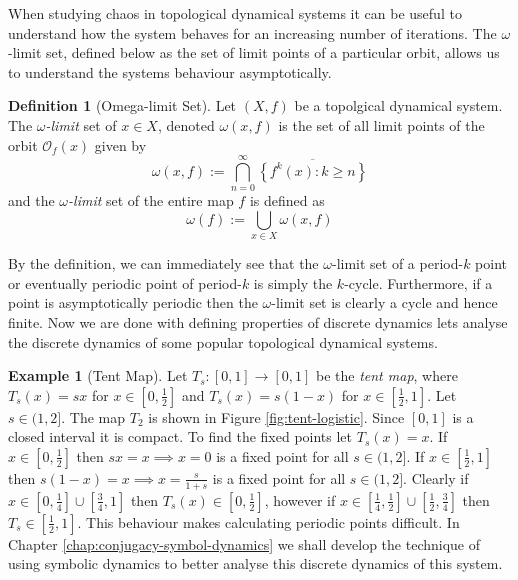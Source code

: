 \documentclass[11pt,a4paper,oneside]{memoir}
\theoremstyle{plain}
\theoremstyle{definition}
\newtheorem{defn}[thm]{Definition}
\newtheorem{exmp}[thm]{Example}
\begin{document}
When studying chaos in topological dynamical systems it can be useful to understand how the system behaves for an increasing number of iterations. The $\omega$-limit set, defined below as the set of limit points of a particular orbit, allows us to understand the systems behaviour asymptotically.

\begin{defn}[Omega-limit Set] \label{defn:omega-limit-set}
    Let $(X, f)$ be a topolgical dynamical system. The $\omega$\emph{-limit} set of $x \in X$, denoted $\omega(x, f)$ is the set of all limit points of the orbit $\mathcal{O}_f(x)$ given by \[\omega(x, f) := \bigcap_{n=0}^\infty\overline{\left\lbrace f^k(x) : k \geq n \right\rbrace}\] and the $\omega$\emph{-limit} set of the entire map $f$ is defined as \[\omega(f) := \bigcup_{x \in X} \omega(x, f)\]
\end{defn}

By the definition, we can immediately see that the $\omega$-limit set of a period-$k$ point or eventually periodic point of period-$k$ is simply the $k$-cycle. Furthermore, if a point is asymptotically periodic then the $\omega$-limit set is clearly a cycle and hence finite. Now we are done with defining properties of discrete dynamics lets analyse the discrete dynamics of some popular topological dynamical systems.

\begin{exmp}[Tent Map] \label{exmp:tent-map}
    Let $T_s: [0, 1] \to [0,1]$ be the \emph{tent map}, where $T_s(x) = sx$ for $x \in \left[0, \frac{1}{2}\right]$ and $T_s(x) = s(1-x)$ for $x \in \left[\frac{1}{2}, 1\right]$. Let $s \in (1, 2]$. The map $T_2$ is shown in Figure \ref{fig:tent-logistic}. Since $[0, 1]$ is a closed interval it is compact. To find the fixed points let $T_s(x) = x$. If $x \in \left[0, \frac{1}{2}\right]$ then $sx = x \implies x = 0$ is a fixed point for all $s \in (1, 2]$. If $x \in \left[\frac{1}{2}, 1\right]$ then $s(1-x) = x \implies x = \frac{s}{1 + s}$ is a fixed point for all $s \in (1, 2]$. Clearly if $x \in \left[0, \frac{1}{4}\right] \cup \left[\frac{3}{4}, 1\right]$ then $T_s(x) \in \left[0, \frac{1}{2}\right]$, however if $x \in \left[\frac{1}{4}, \frac{1}{2}\right] \cup \left[\frac{1}{2}, \frac{3}{4}\right]$ then $T_s \in \left[\frac{1}{2}, 1\right]$. This behaviour makes calculating periodic points difficult. In Chapter \ref{chap:conjugacy-symbol-dynamics} we shall develop the technique of using symbolic dynamics to better analyse this discrete dynamics of this system.
\end{exmp}
\end{document}
